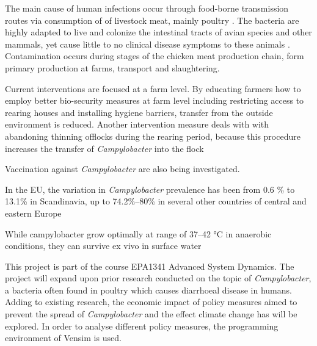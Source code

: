 The main cause of human infections occur through food-borne transmission routes via consumption of of livestock meat, mainly poultry \cite{wilson_tracing_2008}. The bacteria are highly adapted to live and colonize the intestinal tracts of avian species and other mammals, yet cause little to no clinical disease symptoms to these animals \cite{saif_diseases_2008}. Contamination occurs during stages of the chicken meat production chain, form primary production at farms, transport and slaughtering. %

Current interventions are focused at a farm level. By educating farmers how to employ better bio-security measures at farm level including restricting access to rearing houses and installing hygiene barriers, transfer from the outside environment is reduced. Another intervention measure deals with with abandoning thinning offlocks during the rearing period, because this procedure increases the transfer of \textit{Campylobacter} into the flock

Vaccination against \textit{Campylobacter} are also being investigated. %


In the EU, the variation in \textit{Campylobacter} prevalence has been from 0.6 \% to 13.1\% in Scandinavia, up to 74.2\%–80\% in  several  other  countries of central and eastern Europe \cite{noauthor_campylobacteriosis_nodate} %

While campylobacter grow optimally at range of 37–42 °C \cite{bronowski_role_2014} in anaerobic conditions, they can survive ex vivo in surface water

















This project is part of the course EPA1341 Advanced System Dynamics. The project will expand upon prior research conducted on the topic of \textit{Campylobacter}, a bacteria often found in poultry which causes diarrhoeal disease in humans. Adding to existing research, the economic impact of policy measures aimed to prevent the spread of  \textit{Campylobacter} and the effect climate change has will be explored. In order to analyse different policy measures, the programming environment of Vensim is used. 

